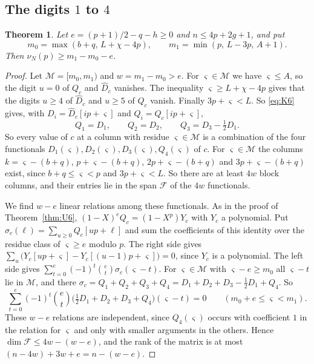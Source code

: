 \documentclass[11pt]{amsart}
\newtheorem{theorem}{Theorem}[section]
\theoremstyle{definition}
\theoremstyle{remark}
\numberwithin{equation}{section}
\begin{document}
\subsection{The digits $1$ to $4$}
\begin{theorem}\label{thm:S}
Let $e=(p+1)/2-q-h\ge0$ and $n\le4p+2g+1$, and put
\[
 m_0=\max(b+q,\,L+\chi-4p),\qquad m_1=\min(p,\,L-3p,\,A+1).
\]
Then $\nu_N(p)\ge m_1-m_0-e$.
\end{theorem}

\begin{proof}
Let $\mathcal M=[m_0,m_1)$ and $w=m_1-m_0>e$. For $\varsigma\in \mathcal M$ we have $\varsigma\le A$, so the digit $u=0$ of $Q_c$ and
$\widehat D_c$ vanishes. The inequality $\varsigma\ge L+\chi-4p$ gives that the digits $u\ge4$ of $\widehat D_c$ and
$u\ge5$ of $Q_c$ vanish. Finally $3p+\varsigma<L$. So \eqref{eq:K6} gives, with $D_i=\widehat D_c[ip+\varsigma]$ and
$Q_i=Q_c[ip+\varsigma]$,
\[
 Q_1=D_1,\qquad Q_2=D_2,\qquad Q_3=D_3-\tfrac12D_1 .
\]
So every value of $c$ at a column with residue $\varsigma\in \mathcal M$ is a combination of the four functionals
$D_1(\varsigma),D_2(\varsigma),D_3(\varsigma),Q_4(\varsigma)$ of $c$. For $\varsigma\in \mathcal M$ the columns $k=\varsigma-(b+q)$, $p+\varsigma-(b+q)$,
$2p+\varsigma-(b+q)$ and $3p+\varsigma-(b+q)$ exist, since $b+q\le\varsigma<p$ and $3p+\varsigma<L$. So there are at least $4w$
block columns, and their entries lie in the span $\mathcal F$ of the $4w$ functionals.

We find $w-e$ linear relations among these functionals. As in the proof of Theorem~\ref{thm:U6},
$(1-X)^eQ_c=(1-X^p)Y_c$ with $Y_c$ a polynomial. Put $\sigma_c(\ell)=\sum_{u\ge0}Q_c[up+\ell]$ and sum the
coefficients of this identity over the residue class of $\varsigma\ge e$ modulo $p$. The right side gives
$\sum_u\bigl(Y_c[up+\varsigma]-Y_c[(u-1)p+\varsigma]\bigr)=0$, since $Y_c$ is a polynomial. The left side gives
$\sum_{t=0}^e(-1)^t\binom et\sigma_c(\varsigma-t)$. For $\varsigma\in \mathcal M$ with $\varsigma-e\ge m_0$ all $\varsigma-t$ lie in $\mathcal M$, and there
$\sigma_c=Q_1+Q_2+Q_3+Q_4=D_1+D_2+D_3-\tfrac12D_1+Q_4$. So
\[
 \sum_{t=0}^e(-1)^t\binom et\bigl(\tfrac12D_1+D_2+D_3+Q_4\bigr)(\varsigma-t)=0\qquad(m_0+e\le\varsigma<m_1).
\]
These $w-e$ relations are independent, since $Q_4(\varsigma)$ occurs with coefficient $1$ in the relation for $\varsigma$
and only with smaller arguments in the others. Hence $\dim \mathcal F\le4w-(w-e)$, and the rank of the matrix is at
most $(n-4w)+3w+e=n-(w-e)$.
\end{proof}
\end{document}
